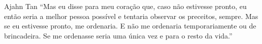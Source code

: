 
\begin{quotepage}{0.58\linewidth}{Ajahn Tan}
“Mas eu disse para meu coração que, caso não estivesse pronto, eu então
seria a melhor pessoa possível e tentaria observar os preceitos,
sempre. Mas se eu estivesse pronto, me ordenaria. E não me ordenaria
temporariamente ou de brincadeira. Se me ordenasse seria uma única vez
e para o resto da vida.”
\end{quotepage}

